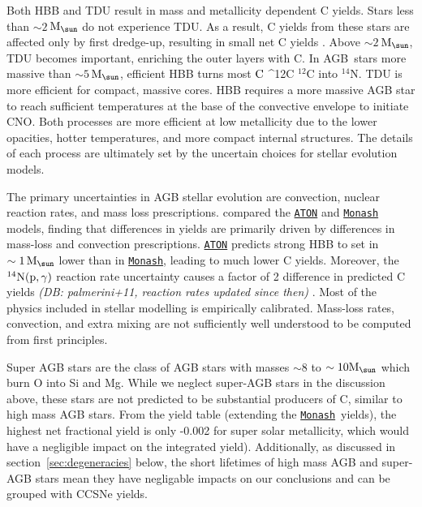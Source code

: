 \documentclass[fleqn,
usenatbib]{mnras}
\makeatletter
\newcommand{\monash}{\texttt{\hyperlink{monash}{Monash}}}
\newcommand{\aton}{\texttt{\hyperlink{aton}{ATON}}}
\newcommand{\agb}{AGB}
\newcommand{\C}[1][\@nil]{
    \def\tmp{#1}%
    \ifx\tmp\@nnil%
        \ensuremath{\rm C}%
    \else%
        \ifmmode ^{#1}{\rm C}%
        \else $^{#1}$C%
        \fi%
\fi }
\newcommand{\Mo}{ {\rm M}_{\sun}}
\newcommand{\about}[1]{${\sim} #1$}
\newcommand{\dbnote}[1]{ {\color{Thistle} \textit{\small (DB: #1)}} }
\makeatother
\begin{document}


Both HBB and TDU result in mass and metallicity dependent C yields. 
Stars less than \about{2}\,$\Mo$ do not experience TDU. As a result, C yields from these stars are affected only by first dredge-up, resulting in small net C yields \citep[Table 1]{karakas10}.
Above \about{2}\,$\Mo$, TDU becomes important, enriching the outer layers with C.
In \agb\ stars more massive than \about{5}\,$\Mo$, efficient HBB turns most \C[12] into $^{14}$N.
TDU is more efficient for compact, massive cores. HBB requires a more massive AGB star to reach sufficient temperatures at the base of the convective envelope to initiate CNO. Both processes are more efficient at low metallicity due to the lower opacities, hotter temperatures, and more compact internal structures. The details of each process are ultimately set by the uncertain choices for stellar evolution models.



The primary uncertainties in AGB stellar evolution are convection, nuclear reaction rates, and mass loss prescriptions.
\citet{ventura+15} compared the \aton{} and \monash{} models, finding that differences in yields are primarily driven by differences in mass-loss and convection prescriptions. \aton{} predicts strong HBB to set in $\sim{1}\,\Mo$ lower than in \monash{}, leading to much lower C yields.
Moreover, the $^{14}{\rm N}({\rm p},\gamma)$ reaction rate uncertainty causes a factor of 2 difference in predicted C yields \citep{herwig+austin2004, HAL2006} \dbnote{palmerini+11, reaction rates updated since then}.
Most of the physics included in stellar modelling is empirically calibrated. Mass-loss rates, convection, and extra mixing are not sufficiently well understood to be computed from first principles.

Super AGB stars are the class of AGB stars with masses $\sim8$ to $\sim10\Mo$ which burn O into Si and Mg. While we neglect super-AGB stars in the discussion above, these stars are not predicted to be substantial producers of C, similar to high mass AGB stars. From the \citet{doherty+14, doherty+14b} yield table (extending the \monash\ yields), the highest net fractional yield is only -0.002 for super solar metallicity, which would have a negligible impact on the integrated yield). Additionally, as discussed in section~\ref{sec:degeneracies} below, the short lifetimes of high mass AGB and super-AGB stars mean they have negligable impacts on our conclusions and can be grouped with CCSNe yields.
\end{document}
